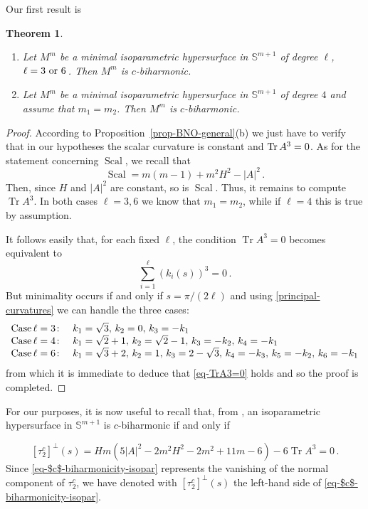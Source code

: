 \documentclass[11pt,leqno]{amsart}
\theoremstyle{plain}
\newtheorem{theorem}                {Theorem}      [section]
\theoremstyle{definition}
\numberwithin{equation}{section}
\def \s{{\mathbb S}}
\newcommand{\Scal}{\operatorname{Scal}}
\DeclareMathOperator{\trace}{Tr}
\numberwithin{equation}{section}
\begin{document}
{Our first result is
\begin{theorem}\label{th-isop-minimal}\quad 
\begin{enumerate}
\item[{\rm (a)}] Let $M^m$ be a minimal isoparametric hypersurface in $\s^{m+1}$ of degree $\ell$, $\ell=3\,\,{\rm or}\,\,6\,$. Then $M^m$ is $c$-biharmonic.
\item[{\rm (b)}] Let $M^m$ be a minimal isoparametric hypersurface in $\s^{m+1}$ of degree $4$ and assume that $m_1=m_2$. Then $M^m$ is $c$-biharmonic.
\end{enumerate}
\end{theorem}
\begin{proof} According to Proposition~\ref{prop-BNO-general}(b) we just have to verify that in our hypotheses the scalar curvature is constant and ${\rm Tr}\,A^3=0$. As for the statement concerning $\Scal$, we recall that
\[
\Scal=m(m-1)+m^2 H^2-|A|^2\,.
\]
Then, since $H$ and $|A|^2$ are constant, so is $\Scal$.  Thus, it remains to compute $\trace A^3$. In both cases $\ell=3,6$ we know that $m_1=m_2$, while if $\ell=4$ this is true by assumption. 

It follows easily that, for each fixed $\ell$, the condition $\trace A^3=0$ becomes equivalent to
\begin{equation}\label{eq-TrA3=0}
\sum_{i=1}^\ell \left (k_i(s) \right)^3=0\,.
\end{equation}
But minimality occurs if and only if $s=\pi / (2 \ell)$ and using \eqref{principal-curvatures} we can handle the three cases:
\[
\begin{array}{ll}
{\rm Case}\,\ell=3 \colon & k_1=\sqrt{3},\,k_2=0,\,k_3=-k_1\\
{\rm Case}\,\ell=4 \colon & k_1=\sqrt{2}+1,\,k_2=\sqrt{2}-1,\,k_3=-k_2,\,k_4=-k_1\\
{\rm Case}\,\ell=6 \colon &k_1=\sqrt{3}+2,\,k_2=1,\,k_3=2-\sqrt{3},\,k_4=-k_3,\,k_5=-k_2,\,k_6=-k_1
\end{array}
\]
from which it is immediate to deduce that \eqref{eq-TrA3=0} holds and so the proof is completed.

\end{proof}

For our purposes, it is now useful to recall that, from \cite{arXiv:2311.04493}, an isoparametric hypersurface  in $\s^{m+1}$ is $c$-biharmonic if and only if

\begin{equation}\label{eq-$c$-biharmonicity-isopar}
[\tau_2^c]^\perp(s)=H m \left(5 |A|^2-2 m^2 H^2-2 m^2+11 m-6\right)-6 \trace A^3=0 \,.
\end{equation}
Since \eqref{eq-$c$-biharmonicity-isopar} represents the vanishing of the normal component of $\tau_2^c$, we have denoted with $[\tau_2^c]^\perp(s)$ the left-hand side of \eqref{eq-$c$-biharmonicity-isopar}.

}
\end{document}
